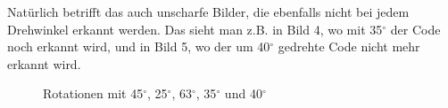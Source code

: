 Natürlich betrifft das auch unscharfe Bilder, die ebenfalls nicht bei jedem Drehwinkel erkannt werden. Das sieht man z.B. in Bild 4, wo mit 35$^\circ$ der Code noch erkannt wird, und in Bild 5, wo der um 40$^\circ$ gedrehte Code nicht mehr erkannt wird.
\begin{figure}[H]
  \centering
  \setlength{\fboxrule}{1pt}
  \caption{Rotationen mit 45$^\circ$, 25$^\circ$, 63$^\circ$, 35$^\circ$ und 40$^\circ$}
  \label{fig:qrrotate}
\end{figure}

